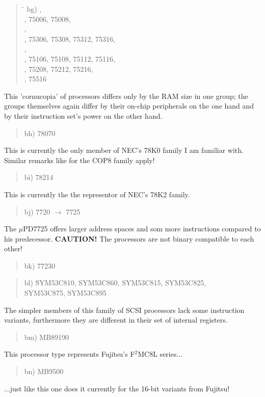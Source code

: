 \documentclass[12pt,twoside]{report}
\begin{document}
\begin{quote}
\begin{tabbing}
\hspace{0.7cm} \= \kill
bg) ,\\
    , 75006, 75008,\\
    ,\\
    , 75306, 75308, 75312, 75316,\\
    ,\\
    , 75106, 75108, 75112, 75116,\\
    , 75208, 75212, 75216,\\
    , 75516\\
\end{tabbing}
\end{quote}
This 'cornucopia' of processors differs only by the RAM size in one
group; the groups themselves again differ by their on-chip
peripherals on the one hand and by their instruction set's power on
the other hand.
\begin{quote}
bh) 78070
\end{quote}
This is currently the only member of NEC's 78K0 family I am familiar
with.  Similar remarks like for the COP8 family apply!
\begin{quote}
bi) 78214
\end{quote}
This is currently the the representor of NEC's 78K2 family.
\begin{quote}
bj) 7720 $\rightarrow$ 7725
\end{quote}
The $\mu$PD7725 offers larger address spaces and som more instructions
compared to his predecessor. {\bf CAUTION!}  The processors are not binary
compatible to each other!
\begin{quote}
bk) 77230
\end{quote}
\begin{quote}
\begin{tabbing}
bl) \= SYM53C810, SYM53C860, SYM53C815, SYM53C825, \\
    \> SYM53C875, SYM53C895
\end{tabbing}
\end{quote}
The simpler members of this family of SCSI processors lack some
instruction variants, furthermore they are different in their set of
internal registers.
\begin{quote}
bm) MB89190  
\end{quote}  
This processor type represents Fujitsu's F$^{2}$MC8L series...
\begin{quote}
bn) MB9500
\end{quote}
...just like this one does it currently for the 16-bit variants from
Fujitsu!
\end{document}
